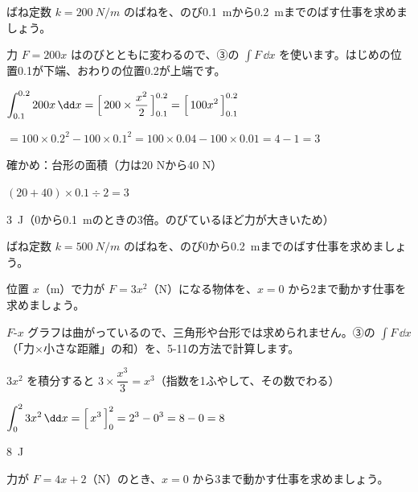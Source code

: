 \begin{reidai}
ばね定数 $k=\qty{200}{N/m}$ のばねを、のび\qty{0.1}{m}から\qty{0.2}{m}までのばす仕事を求めましょう。\par
\kangaekata 力 $F=200x$ はのびとともに変わるので、③の $\int F\,\dd x$ を使います。はじめの位置0.1が下端、おわりの位置0.2が上端です。\par
\shiki $\displaystyle\int_{0.1}^{0.2}200x\,\dd x=\Bigl[\,200\times\frac{x^2}{2}\,\Bigr]_{0.1}^{0.2}=\Bigl[\,100x^2\,\Bigr]_{0.1}^{0.2}$\par
\hspace*{2.6\zw}$=100\times0.2^2-100\times0.1^2=100\times0.04-100\times0.01=4-1=3$\par
\hspace*{2.6\zw}確かめ：台形の面積（力は20 Nから40 N）\par
\hspace*{2.6\zw}$(20+40)\times0.1\div2=3$\par
\kotae \qty{3}{J}（0から\qty{0.1}{m}のときの3倍。のびているほど力が大きいため）
\end{reidai}

\begin{jibun}
ばね定数 $k=\qty{500}{N/m}$ のばねを、のび0から\qty{0.2}{m}までのばす仕事を求めましょう。
\end{jibun}

\begin{reidai}[グラフが曲がっている力の仕事]
位置 $x$（m）で力が $F=3x^2$（N）になる物体を、$x=0$ から2まで動かす仕事を求めましょう。\par
\kangaekata $F$-$x$ グラフは曲がっているので、三角形や台形では求められません。③の $\int F\,\dd x$（「力×小さな距離」の和）を、5-11の方法で計算します。\par
\shiki $3x^2$ を積分すると $3\times\dfrac{x^3}{3}=x^3$（指数を1ふやして、その数でわる）\par
\hspace*{2.6\zw}$\displaystyle\int_0^2 3x^2\,\dd x=\Bigl[\,x^3\,\Bigr]_0^2=2^3-0^3=8-0=8$\par
\kotae \qty{8}{J}
\end{reidai}

\begin{jibun}
力が $F=4x+2$（N）のとき、$x=0$ から3まで動かす仕事を求めましょう。
\end{jibun}


